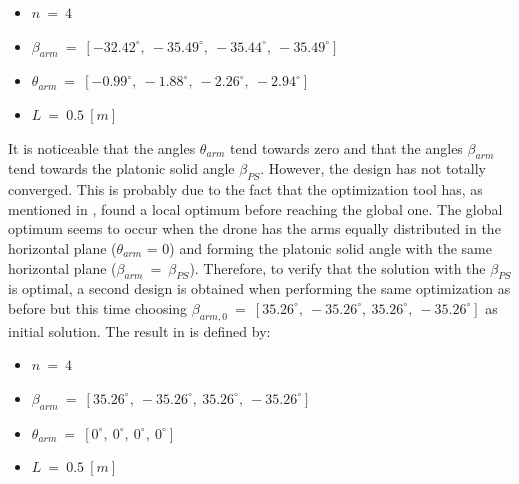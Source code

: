 {\small\begin{itemize}
  \item $n\ =\ 4$
  \item $\beta_{arm}\ =\ [-32.42^{\circ},\  -35.49^{\circ},\  -35.44^{\circ},\  -35.49^{\circ}]$
  \item $\theta_{arm}\ =\ [-0.99^{\circ},\  -1.88^{\circ},\  -2.26^{\circ},\  -2.94^{\circ}]$
  \item $L\ =\ 0.5\ [m]$
\end{itemize}}

It is noticeable that the angles $\theta_{arm}$ tend towards zero and that the
angles $\beta_{arm}$ tend towards the platonic solid angle $\beta_{PS}$. However,
the design has not totally converged. This is probably due to the fact that the
optimization tool has, as mentioned in , found a local
optimum before reaching the global one. The global optimum seems to occur when the
drone has the arms equally distributed in the horizontal plane ($\theta_{arm}$ = 0)
and forming the platonic solid angle with the same horizontal plane ($\beta_{arm}\ =\
\beta_{PS}$). Therefore, to verify that the solution with the $\beta_{PS}$ is optimal,
a second design is obtained when performing the same optimization as before but
this time choosing $\beta_{arm,0} \ =\ [35.26^{\circ},\  -35.26^{\circ},\ 35.26^{\circ},\
-35.26^{\circ}]$ as initial solution. The result in 
is defined by:

{\small\begin{itemize}
  \item $n\ =\ 4$
  \item $\beta_{arm}\ =\ [35.26^{\circ},\  -35.26^{\circ},\  35.26^{\circ},\  -35.26^{\circ}]$
  \item $\theta_{arm}\ =\ [0^{\circ},\  0^{\circ},\  0^{\circ},\  0^{\circ}]$
  \item $L\ =\ 0.5\ [m]$
\end{itemize}}

